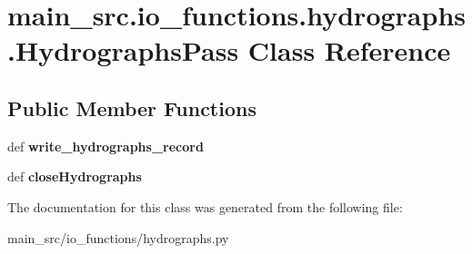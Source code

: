 \hypertarget{classmain__src_1_1io__functions_1_1hydrographs_1_1HydrographsPass}{\section{main\-\_\-src.\-io\-\_\-functions.\-hydrographs.\-Hydrographs\-Pass Class Reference}
\label{classmain__src_1_1io__functions_1_1hydrographs_1_1HydrographsPass}
}
\subsection*{Public Member Functions}
\begin{DoxyCompactItemize}
\item 
\hypertarget{classmain__src_1_1io__functions_1_1hydrographs_1_1HydrographsPass_aa0af869aff0232aefc1f3a4750362979}{def {\bfseries write\-\_\-hydrographs\-\_\-record}}\label{classmain__src_1_1io__functions_1_1hydrographs_1_1HydrographsPass_aa0af869aff0232aefc1f3a4750362979}

\item 
\hypertarget{classmain__src_1_1io__functions_1_1hydrographs_1_1HydrographsPass_a07c8c94841e43177b3b13eef15219c64}{def {\bfseries close\-Hydrographs}}\label{classmain__src_1_1io__functions_1_1hydrographs_1_1HydrographsPass_a07c8c94841e43177b3b13eef15219c64}

\end{DoxyCompactItemize}


The documentation for this class was generated from the following file\-:\begin{DoxyCompactItemize}
\item 
main\-\_\-src/io\-\_\-functions/hydrographs.\-py\end{DoxyCompactItemize}
